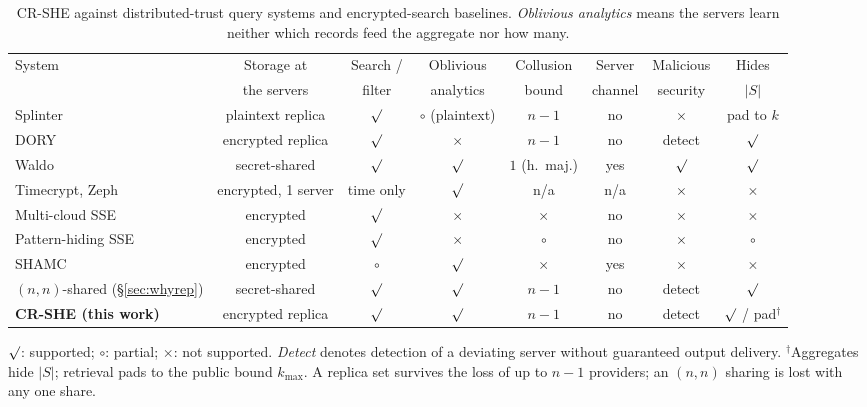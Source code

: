 \documentclass[a4paper,fleqn]{cas-dc}
\providecommand{\checkmark}{\ensuremath{\surd}}
\begin{document}
\begin{table}[pos=t,width=\textwidth]
\caption{CR-SHE against distributed-trust query systems and encrypted-search
baselines. \emph{Oblivious analytics} means the servers learn neither which
records feed the aggregate nor how many.}
\label{tab:compare}
\centering
\scriptsize
\setlength{\tabcolsep}{3pt}
\begin{tabular*}{\tblwidth}{@{\extracolsep{\fill}}lccccccc@{}}
\toprule
System & Storage at & Search / & Oblivious & Collusion & Server & Malicious &
Hides \\
 & the servers & filter & analytics & bound & channel & security & $|S|$ \\
\midrule
Splinter \citep{splinter} & plaintext replica & $\checkmark$ &
$\circ$ (plaintext) & $n-1$ & no & $\times$ & pad to $k$ \\
DORY \citep{dory} & encrypted replica & $\checkmark$ & $\times$ & $n-1$ & no &
detect & $\checkmark$ \\
Waldo \citep{waldo} & secret-shared & $\checkmark$ & $\checkmark$ &
$1$ (h.\ maj.) & yes & $\checkmark$ & $\checkmark$ \\
Timecrypt, Zeph \citep{timecrypt,zeph} & encrypted, 1 server & time only &
$\checkmark$ & n/a & n/a & $\times$ & $\times$ \\
Multi-cloud SSE \citep{xu2021privacy} & encrypted & $\checkmark$ & $\times$ &
$\times$ & no & $\times$ & $\times$ \\
Pattern-hiding SSE \citep{xu2023symmetric} & encrypted & $\checkmark$ &
$\times$ & $\circ$ & no & $\times$ & $\circ$ \\
SHAMC \citep{wang2020shamc} & encrypted & $\circ$ & $\checkmark$ & $\times$ &
yes & $\times$ & $\times$ \\
\midrule
$(n,n)$-shared (\S\ref{sec:whyrep}) & secret-shared & $\checkmark$ &
$\checkmark$ & $n-1$ & no & detect & $\checkmark$ \\
\textbf{CR-SHE (this work)} & encrypted replica & $\checkmark$ & $\checkmark$ &
$n-1$ & no & detect & $\checkmark$ / pad$^{\dagger}$ \\
\bottomrule
\end{tabular*}
\vspace{3pt}
\begin{flushleft}
\footnotesize
$\checkmark$: supported; $\circ$: partial; $\times$: not supported.
\emph{Detect} denotes detection of a deviating server without guaranteed
output delivery. $^{\dagger}$Aggregates hide $|S|$; retrieval pads to the
public bound $k_{\max}$. A replica set survives the loss of up to $n-1$
providers; an $(n,n)$ sharing is lost with any one share.
\end{flushleft}
\end{table}
\end{document}
